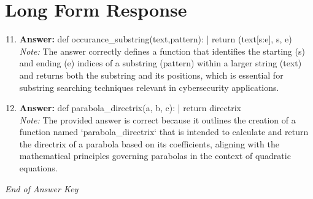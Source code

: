 \documentclass[12pt]{article}
\begin{document}
\section*{Long Form Response}
\begin{enumerate}[label=\arabic*.]
\setcounter{enumi}{10}
\item \textbf{Answer:} def occurance\_substring(text,pattern): | return (text[s:e], s, e)
\\ \textit{Note:} The answer correctly defines a function that identifies the starting (s) and ending (e) indices of a substring (pattern) within a larger string (text) and returns both the substring and its positions, which is essential for substring searching techniques relevant in cybersecurity applications.
\item \textbf{Answer:} def parabola\_directrix(a, b, c): | return directrix
\\ \textit{Note:} The provided answer is correct because it outlines the creation of a function named `parabola\_directrix` that is intended to calculate and return the directrix of a parabola based on its coefficients, aligning with the mathematical principles governing parabolas in the context of quadratic equations.
\end{enumerate}

\vfill
\noindent\textit{End of Answer Key}
\end{document}

